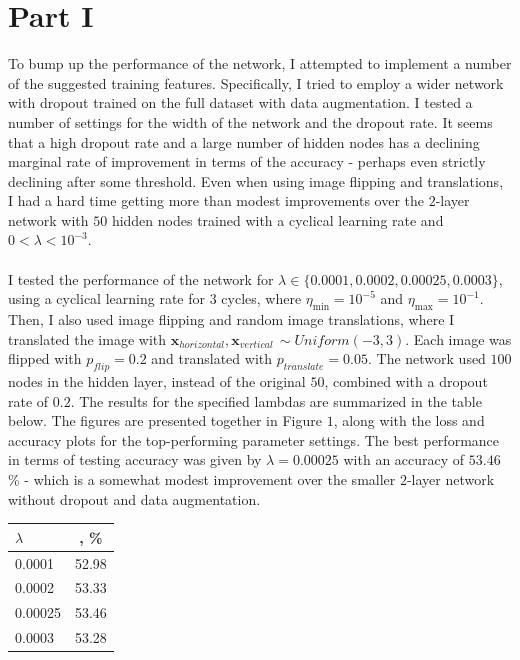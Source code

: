 \documentclass{article}
\begin{document}
\section*{Part I}

	To bump up the performance of the network, I attempted to implement a number of the suggested training features. Specifically, I tried to employ a wider network with dropout trained on the full dataset with data augmentation. I tested a number of settings for the width of the network and the dropout rate. It seems that a high dropout rate and a large number of hidden nodes has a declining marginal rate of improvement in terms of the accuracy - perhaps even strictly declining after some threshold. Even when using image flipping and translations, I had a hard time getting more than modest improvements over the $2$-layer network with $50$ hidden nodes trained with a cyclical learning rate and $0 < \lambda < 10^{-3}$.\\\\
%
	I tested the performance of the network for $\lambda \in \{0.0001, 0.0002, 0.00025, 0.0003\}$, using a cyclical learning rate for $3$ cycles, where $\eta_{\text{min}} = 10^{-5}$ and $\eta_{\text{max}} = 10^{-1}$. Then, I also used image flipping and random image translations, where I translated the image with $\bm{x}_{horizontal}, \bm{x}_{vertical}\,\sim Uniform(-3, 3)$. Each image was flipped with $p_{flip} = 0.2$ and translated with $p_{translate} = 0.05$. The network used $100$ nodes in the hidden layer, instead of the original $50$, combined with a dropout rate of $0.2$. The results for the specified lambdas are summarized in the table below. The figures are presented together in Figure $1$, along with the loss and accuracy plots for the top-performing parameter settings. The best performance in terms of testing accuracy was given by $\lambda = 0.00025$ with an accuracy of $53.46$\% - which is a somewhat modest improvement over the smaller $2$-layer network without dropout and data augmentation.
	\vspace{0.3cm}
	\begin{center}	
	\begin{tabular}{|l|c|}
		\hline
		 $\lambda$ & \text{Accuracy}, \% \\ \hline
		0.0001 & 52.98\\ 
		0.0002 & 53.33\\
		0.00025 & 53.46\\
		0.0003 & 53.28\\\hline
	\end{tabular}
	\end{center}
\end{document}
